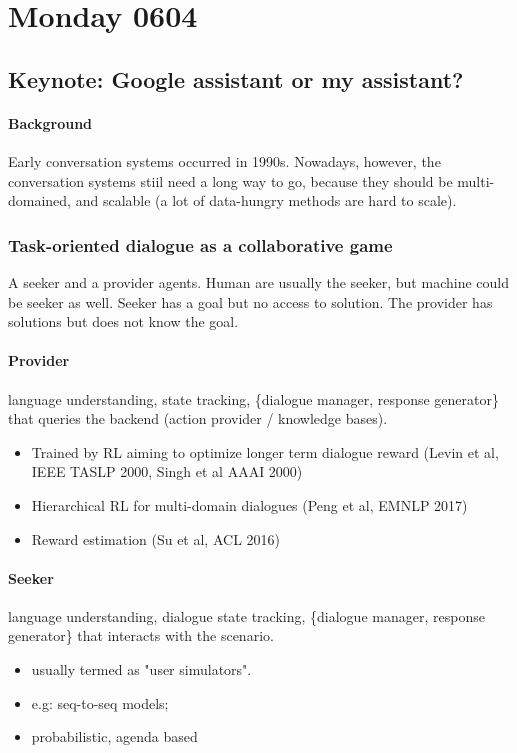\section{Monday 0604}

\subsection{Keynote: Google assistant or my assistant?}

\paragraph{Background}
Early conversation systems occurred in 1990s. Nowadays, however, the conversation systems stiil need a long way to go, because they should be multi-domained, and scalable (a lot of data-hungry methods are hard to scale).

\subsubsection{Task-oriented dialogue as a collaborative game}
A seeker and a provider agents. Human are usually the seeker, but machine could be seeker as well. Seeker has a goal but no access to solution. The provider has solutions but does not know the goal.

\paragraph{Provider} language understanding, state tracking, \{dialogue manager, response generator\} that queries the backend (action provider / knowledge bases).
\begin{itemize}
	\item Trained by RL aiming to optimize longer term dialogue reward (Levin et al, IEEE TASLP 2000, Singh et al AAAI 2000)
	\item Hierarchical RL for multi-domain dialogues (Peng et al, EMNLP 2017)
	\item Reward estimation (Su et al, ACL 2016)
\end{itemize}

\paragraph{Seeker} language understanding, dialogue state tracking, \{dialogue manager, response generator\} that interacts with the scenario.
\begin{itemize}
	\item usually termed as "user simulators". \item e.g: seq-to-seq models; 
	\item probabilistic, agenda based \cite{Shah2018Neural}
\end{itemize}


